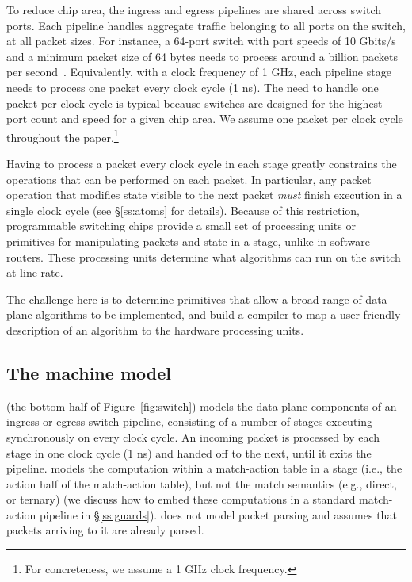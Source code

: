 To reduce chip area, the ingress and egress pipelines are shared across switch
ports.  Each pipeline handles aggregate traffic belonging to all ports
on the switch, at all packet sizes.  For instance, a 64-port switch with port
speeds of 10 Gbits/s and a minimum packet size of 64 bytes needs to
process around a billion packets per second~\cite{rmt}.  Equivalently, with a
clock frequency of 1 GHz, each pipeline stage needs to process one packet every
clock cycle (1 ns).  The need to handle one packet per clock cycle is typical
because switches are designed for the highest port count and speed for a given
chip area. We assume one packet per clock cycle throughout the
paper.\footnote{For concreteness, we assume a 1 GHz clock frequency.}

Having to process a packet every clock cycle in each stage greatly
constrains the operations that can be performed on each packet. In
particular, any packet operation that modifies state visible to the
next packet {\em must} finish execution in a single clock cycle (see
\S\ref{ss:atoms} for details). Because of this restriction,
programmable switching chips provide a small set of processing units
or primitives for manipulating packets and state in a stage, unlike in
software routers. These processing units determine what algorithms can
run on the switch at line-rate.

The challenge here is to determine primitives that allow a broad range
of data-plane algorithms to be implemented, and build a compiler to
map a user-friendly description of an algorithm to the hardware
processing units.


\subsection{The \absmachine machine model}

\absmachine (the bottom half of Figure~\ref{fig:switch}) models the
data-plane components of an ingress or egress switch pipeline,
consisting of a number of stages executing synchronously on every
clock cycle. An incoming packet is processed by each stage in one
clock cycle (1 ns) and handed off to the next, until it exits the
pipeline. \absmachine models the computation within a match-action
table in a stage (i.e., the action half of the match-action table),
but not the match semantics (e.g., direct, or ternary) (we discuss how
to embed these computations in a standard match-action pipeline in
\S\ref{ss:guards}). \absmachine does not model packet parsing and
assumes that packets arriving to it are already parsed.

